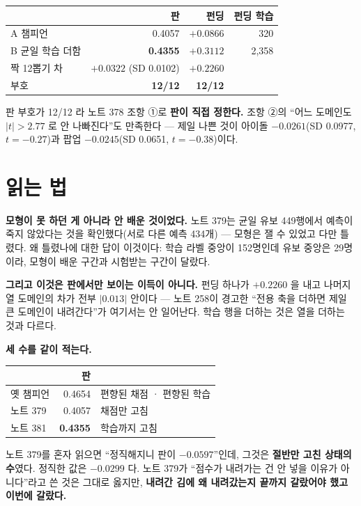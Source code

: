 \documentclass[11pt]{article}
\begin{document}
\begin{center}
\begin{tabular}{lrrr}
\hline
 & 판 & 펀딩 & 펀딩 학습 \\
\hline
A 챔피언 & 0.4057 & $+0.0866$ & 320 \\
B 균일 학습 더함 & \textbf{0.4355} & $\mathbf{+0.3112}$ & 2,358 \\
\hline
짝 12뽑기 차 & $+0.0322$ (SD 0.0102) & $+0.2260$ & \\
부호 & \textbf{12/12} & \textbf{12/12} & \\
\hline
\end{tabular}
\end{center}

판 부호가 12/12 라 노트 378 조항 ①로 \textbf{판이 직접 정한다.} 조항 ②의
``어느 도메인도 $|t|>2.77$ 로 안 나빠진다''도 만족한다 --- 제일 나쁜 것이
아이돌 $-0.0261$(SD 0.0977, $t=-0.27$)과 팝업 $-0.0245$(SD 0.0651,
$t=-0.38$)이다.

\section{읽는 법}

\textbf{모형이 못 하던 게 아니라 안 배운 것이었다.} 노트 379는 균일 유보
449행에서 예측이 죽지 않았다는 것을 확인했다(서로 다른 예측 434개) ---
모형은 잴 수 있었고 다만 틀렸다. 왜 틀렸나에 대한 답이 이것이다: 학습
라벨 중앙이 152명인데 유보 중앙은 29명이라, 모형이 배운 구간과 시험받는
구간이 달랐다.

\textbf{그리고 이것은 판에서만 보이는 이득이 아니다.} 펀딩 하나가
$+0.2260$ 을 내고 나머지 열 도메인의 차가 전부 $|0.013|$ 안이다 --- 노트
258이 경고한 ``전용 축을 더하면 제일 큰 도메인이 내려간다''가 여기서는
안 일어난다. 학습 행을 더하는 것은 열을 더하는 것과 다르다.

\textbf{세 수를 같이 적는다.}

\begin{center}
\begin{tabular}{lrl}
\hline
 & 판 & \\
\hline
옛 챔피언 & 0.4654 & 편향된 채점 · 편향된 학습 \\
노트 379 & 0.4057 & 채점만 고침 \\
노트 381 & \textbf{0.4355} & 학습까지 고침 \\
\hline
\end{tabular}
\end{center}

노트 379를 혼자 읽으면 ``정직해지니 판이 $-0.0597$''인데, 그것은
\textbf{절반만 고친 상태의 수}였다. 정직한 값은 $-0.0299$ 다. 노트 379가
``점수가 내려가는 건 안 넣을 이유가 아니다''라고 쓴 것은 그대로 옳지만,
\textbf{내려간 김에 왜 내려갔는지 끝까지 갈랐어야 했고 이번에 갈랐다.}
\end{document}
